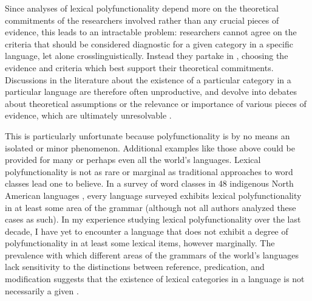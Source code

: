 Since analyses of lexical polyfunctionality depend more on the theoretical commitments of the researchers involved rather than any crucial pieces of evidence, this leads to an intractable problem: researchers cannot agree on the criteria that should be considered diagnostic for a given category in a specific language, let alone crosslinguistically. Instead they partake in  \parencite[30]{Croft2001b}, choosing the evidence and criteria which best support their theoretical commitments. Discussions in the literature about the existence of a particular category in a particular language are therefore often unproductive, and devolve into debates about theoretical assumptions or the relevance or importance of various pieces of evidence, which are ultimately unresolvable \parencite[435]{Croft2005}.

This is particularly unfortunate because polyfunctionality is by no means an isolated or minor phenomenon. Additional examples like those above could be provided for many or perhaps even all the world's languages. Lexical polyfunctionality is not as rare or marginal as traditional approaches to word classes lead one to believe. In a survey of word classes in 48 indigenous North American languages \parencite{Hieberfc}, every language surveyed exhibits lexical polyfunctionality in at least some area of the grammar (although not all authors analyzed these cases as such). In my experience studying lexical polyfunctionality over the last decade, I have yet to encounter a language that does not exhibit a degree of polyfunctionality in at least some lexical items, however marginally. The prevalence with which different areas of the grammars of the world's languages lack sensitivity to the distinctions between reference, predication, and modification suggests that the existence of lexical categories in a language is not necessarily a given \parencite{Hieberfc}.

